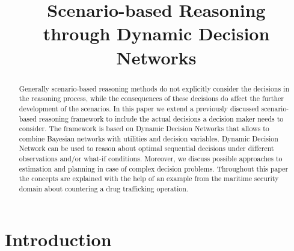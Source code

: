 \documentclass[conference]{IEEEtran}
\begin{document}
\title{Scenario-based Reasoning \\through Dynamic Decision Networks}

\author{
\and
{}
\and
{}
}


\maketitle

\begin{abstract}
Generally scenario-based reasoning methods do not explicitly consider the decisions in the reasoning process, while the consequences of these decisions do affect the further development of the scenarios. In this paper we extend a previously discussed scenario-based reasoning framework to include the actual decisions a decision maker needs to consider. The framework is based on Dynamic Decision Networks that allows to combine Bayesian networks with utilities and decision variables. Dynamic Decision Network can be used to reason about optimal sequential decisions under different observations and/or what-if conditions. Moreover, we discuss possible approaches to estimation and planning in case of complex decision problems. Throughout this paper the concepts are explained with the help of an example from the maritime security domain about countering a drug trafficking operation.
\end{abstract}

\IEEEpeerreviewmaketitle

\section{Introduction}
\end{document}
